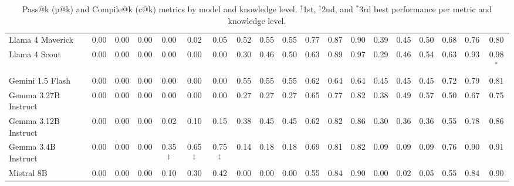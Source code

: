 \begin{table}[htbp]
{\begin{tabular}{l|ccc|ccc|ccc|ccc|ccc|ccc}
Llama 4 Maverick & 0.00 & 0.00 & 0.00 & 0.00 & 0.02 & 0.05 & 0.52 & 0.55 & 0.55 & 0.77 & 0.87 & 0.90 & 0.39 & 0.45 & 0.50 & 0.68 & 0.76 & 0.80 \\
Llama 4 Scout & 0.00 & 0.00 & 0.00 & 0.00 & 0.00 & 0.00 & 0.30 & 0.46 & 0.50 & 0.63 & 0.89 & 0.97 & 0.29 & 0.46 & 0.54 & 0.63 & 0.93 & 0.98$^\ast$ \\
Gemini 1.5 Flash & 0.00 & 0.00 & 0.00 & 0.00 & 0.00 & 0.00 & 0.55 & 0.55 & 0.55 & 0.62 & 0.64 & 0.64 & 0.45 & 0.45 & 0.45 & 0.72 & 0.79 & 0.81 \\
Gemma 3.27B Instruct & 0.00 & 0.00 & 0.00 & 0.00 & 0.00 & 0.00 & 0.27 & 0.27 & 0.27 & 0.65 & 0.77 & 0.82 & 0.38 & 0.49 & 0.57 & 0.50 & 0.67 & 0.75 \\
Gemma 3.12B Instruct & 0.00 & 0.00 & 0.00 & 0.02 & 0.10 & 0.15 & 0.38 & 0.45 & 0.45 & 0.62 & 0.82 & 0.86 & 0.30 & 0.36 & 0.36 & 0.55 & 0.78 & 0.86 \\
Gemma 3.4B Instruct & 0.00 & 0.00 & 0.00 & 0.35$^\ddag$ & 0.65$^\ddag$ & 0.75$^\ddag$ & 0.14 & 0.18 & 0.18 & 0.69 & 0.81 & 0.82 & 0.09 & 0.09 & 0.09 & 0.76 & 0.90 & 0.91 \\
Mistral 8B & 0.00 & 0.00 & 0.00 & 0.10 & 0.30 & 0.42 & 0.00 & 0.00 & 0.00 & 0.55 & 0.84 & 0.90 & 0.00 & 0.02 & 0.05 & 0.55 & 0.84 & 0.90 \\
\hline
\end{tabular}
}
\caption{Pass@k (p@k) and Compile@k (c@k) metrics by model and knowledge level. $^\dag$1st, $^\ddag$2nd, and $^\ast$3rd best performance per metric and knowledge level.}
\label{tab:metrics_by_knowledge}
\end{table}